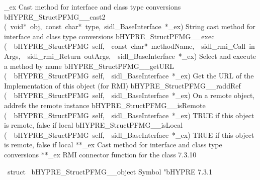 \documentclass{article}
\begin{document}
\begin{cxxentry}
\begin{cxxentry}
\begin{cxxnames}
        {}
\label{cxx.7.3.28}
        {\_ex}
        {}
        {
Cast method for interface and class type conversions}
        {}
\label{cxx.7.3.29}
        {bHYPRE\_StructPFMG\_\_cast2}
        {(\ void*\ obj,\ const\ char*\ type,\ sidl\_BaseInterface\ *\_ex)}
        {
String cast method for interface and class type conversions}
        {}
\label{cxx.7.3.30}
        {bHYPRE\_StructPFMG\_\_exec}
        {(\ \ bHYPRE\_StructPFMG\ self,\ \ const\ char*\ methodName,\ \ sidl\_rmi\_Call\ inArgs,\ \ sidl\_rmi\_Return\ outArgs,\ \ sidl\_BaseInterface\ *\_ex)}
        {
Select and execute a method by name}
        {}
\label{cxx.7.3.31}
        {bHYPRE\_StructPFMG\_\_getURL}
        {(\ \ bHYPRE\_StructPFMG\ self,\ \ sidl\_BaseInterface\ *\_ex)}
        {
Get the URL of the Implementation of this object (for RMI)}
        {}
\label{cxx.7.3.32}
        {bHYPRE\_StructPFMG\_\_raddRef}
        {(\ \ bHYPRE\_StructPFMG\ self,\ \ sidl\_BaseInterface\ *\_ex)}
        {
On a remote object, addrefs the remote instance}
        {}
\label{cxx.7.3.33}
        {bHYPRE\_StructPFMG\_\_isRemote}
        {(\ \ bHYPRE\_StructPFMG\ self,\ \ sidl\_BaseInterface\ *\_ex)}
        {
TRUE if this object is remote, false if local}
        {}
\label{cxx.7.3.34}
        {bHYPRE\_StructPFMG\_\_isLocal}
        {(\ \ bHYPRE\_StructPFMG\ self,\ \ sidl\_BaseInterface\ *\_ex)}
        {
TRUE if this object is remote, false if local}
        {}
\label{cxx.7.3.35}
        {**\_ex}
        {}
        {
Cast method for interface and class type conversions}
        {}
\label{cxx.7.3.36}
        {**\_ex}
        {}
        {
RMI connector function for the class}
        {7.3.10}
\end{cxxnames}
\begin{cxxvariable}
{\ struct\ }
        {bHYPRE\_StructPFMG\_\_object}
        {}
        {
Symbol "bHYPRE}
        {7.3.1}
\begin{cxxdoc}


\end{cxxdoc}
\end{cxxvariable}
\end{cxxentry}
\end{cxxentry}
\end{document}
